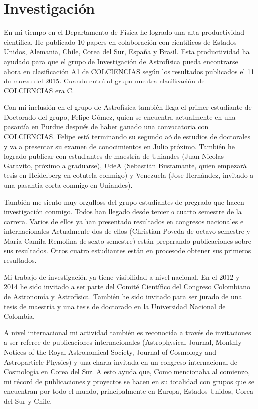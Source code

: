 \documentclass[letterpaper,12pt,onecolumn]{article}
\begin{document}
\section{Investigaci\'on}

En mi tiempo en el Departamento de F\'isica he logrado una alta
productividad cient\'ifica. He publicado 10 papers en colaboraci\'on con cient\'ificos de Estados Unidos, Alemania, Chile, Corea del Sur,
Espa\~na y Brasil. Esta productividad ha ayudado para que el grupo de
Investigaci\'on de Astrof\'isica pueda encontrarse ahora en clasificaci\'on
A1 de COLCIENCIAS seg\'un los resultados publicados el 11 de marzo del
2015. Cuando entr\'e al grupo nuestra clasificaci\'on de COLCIENCIAS era C.   


Con mi inclusi\'on en el grupo de Astrof\'isica tambi\'en llega el primer
estudiante de Doctorado del grupo, Felipe G\'omez, quien se encuentra
actualmente en una pasant\'ia en Purdue despu\'es de haber ganado una
convocatoria con COLCIENCIAS. Felipe est\'a terminando su segundo a\~o de
estudios de doctorales y va a presentar su examen de conocimientos en
Julio pr\'oximo. Tambi\'en he logrado publicar con estudiantes de
maestr\'ia de Uniandes (Juan Nicolas Garavito, pr\'oximo a graduarse),
UdeA (Sebasti\'an Bustamante, quien empezar\'a tesis en Heidelberg en
cotutela conmigo) y Venezuela (Jose Hern\'andez, invitado a una
pasant\'ia corta conmigo en Uniandes). 


Tambi\'en me siento muy orgulloss del grupo estudiantes de pregrado que
hacen investigaci\'on conmigo. Todos han
llegado desde tercer o cuarto semestre de la carrera. Varios de ellos
ya han presentado resultados en congresos nacionales e internacionales
Actualmente dos de ellos (Christian Poveda de octavo
semestre y Mar\'ia Camila Remolina de sexto semestre) est\'an
preparando publicaciones sobre sus resultados. Otros cuatro
estudiantes est\'an en procesode obtener sus primeros resultados. 

Mi trabajo de investigaci\'on ya tiene visibilidad a nivel nacional. En
el 2012 y 2014 he sido invitado a ser parte del Comit\'e Cient\'ifico del
Congreso Colombiano de Astronom\'ia y Astrof\'isica. Tambi\'en he sido
invitado para ser jurado de una tesis de maestr\'ia y una tesis de
doctorado en la Universidad Nacional de Colombia.  

A nivel internacional mi actividad tambi\'en es reconocida a trav\'es de
invitaciones a ser referee de publicaciones internacionales
(Astrophysical Journal, Monthly Notices of the Royal Astronomical
Society, Journal of Cosmology and Astroparticle Physics) y una charla
invitada en un congreso internacional de Cosmología en Corea del
Sur. A esto ayuda que, Como mencionaba al comienzo, mi r\'ecord de
publicaciones y proyectos se hacen en su totalidad con grupos que se
encuentran por todo el mundo, principalmente en Europa, Estados
Unidos, Corea del Sur y Chile.
\end{document}
